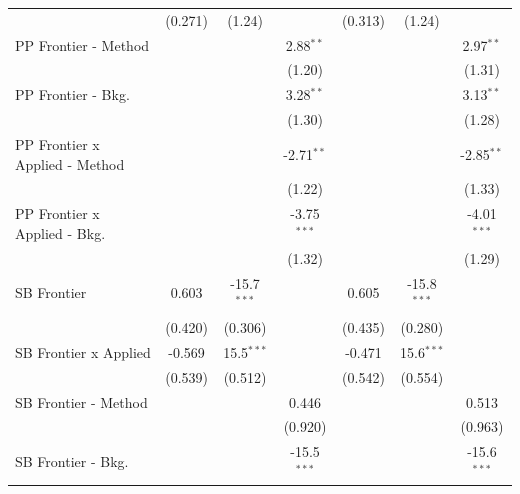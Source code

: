 \begin{tabular}{lcccccc}
                                  & (0.271)        & (1.24)        &               & (0.313)        & (1.24)        &   \\   
   PP Frontier - Method           &                &               & 2.88$^{**}$   &                &               & 2.97$^{**}$\\   
                                  &                &               & (1.20)        &                &               & (1.31)\\   
   PP Frontier - Bkg.             &                &               & 3.28$^{**}$   &                &               & 3.13$^{**}$\\   
                                  &                &               & (1.30)        &                &               & (1.28)\\   
   PP Frontier x Applied - Method &                &               & -2.71$^{**}$  &                &               & -2.85$^{**}$\\   
                                  &                &               & (1.22)        &                &               & (1.33)\\   
   PP Frontier x Applied - Bkg.   &                &               & -3.75$^{***}$ &                &               & -4.01$^{***}$\\   
                                  &                &               & (1.32)        &                &               & (1.29)\\   
   SB Frontier                    & 0.603          & -15.7$^{***}$ &               & 0.605          & -15.8$^{***}$ &   \\   
                                  & (0.420)        & (0.306)       &               & (0.435)        & (0.280)       &   \\   
   SB Frontier x Applied          & -0.569         & 15.5$^{***}$  &               & -0.471         & 15.6$^{***}$  &   \\   
                                  & (0.539)        & (0.512)       &               & (0.542)        & (0.554)       &   \\   
   SB Frontier - Method           &                &               & 0.446         &                &               & 0.513\\   
                                  &                &               & (0.920)       &                &               & (0.963)\\   
   SB Frontier - Bkg.             &                &               & -15.5$^{***}$ &                &               & -15.6$^{***}$\\   

\end{tabular}
